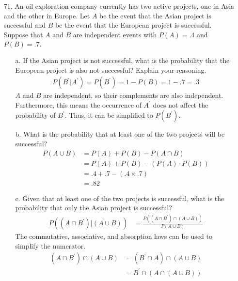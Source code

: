 \documentclass[letterpaper,12pt]{article}
\begin{document}
\maketitle

\begin{enumerate}
  \item[71.]
    An oil exploration company currently has two active projects, one in Asia and the other in Europe. Let $A$ be the event that the Asian project is successful and $B$ be the event that the European project is successful. Suppose that $A$ and $B$ are independent events with $P(A) = .4$ and $P(B) = .7$.
    \begin{enumerate}
      \item[a.]
        If the Asian project is not successful, what is the probability that the European project is also not successful? Explain your reasoning.
        \begin{align*}
          P(B^\prime|A^\prime) = P(B^\prime) = 1 - P(B) = 1 - .7 = .3
        \end{align*}
        $A$ and $B$ are independent, so their complements are also independent. Furthermore, this means the occurrence of $A^\prime$ does not affect the probability of $B^\prime$. Thus, it can be simplified to $P(B^\prime)$.
      \item[b.]
        What is the probability that at least one of the two projects will be successful?
        \begin{align*}
          P(A \cup B) &= P(A) + P(B) - P(A \cap B) \\
          &= P(A) + P(B) - (P(A) \cdot P(B)) \\
          &= .4 + .7 - (.4 \times .7) \\
          &= .82
        \end{align*}
      \item[c.]
        Given that at least one of the two projects is successful, what is the probability that only the Asian project is successful?
        \begin{align*}
          P((A \cap B^\prime)|(A \cup B)) &= \frac{P((A \cap B^\prime) \cap (A \cup B))}{P(A \cup B)}
        \end{align*}
        The commutative, associative, and absorption laws can be used to simplify the numerator.
        \begin{align*}
          (A \cap B^\prime) \cap (A \cup B) &= (B^\prime \cap A) \cap (A \cup B) \\
          &= B^\prime \cap (A \cap (A \cup B)) \\

\end{align*}
\end{enumerate}
\end{enumerate}
\end{document}
